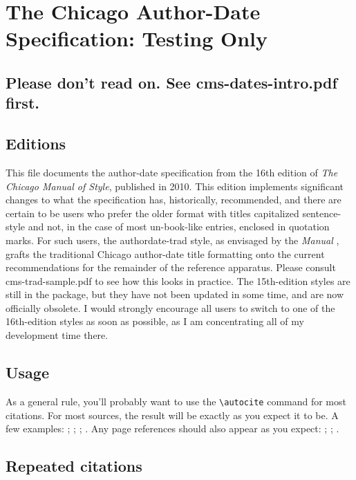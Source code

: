 \documentclass[a4paper,12pt]{report}
\newcommand{\cmd}[1]{\texttt{\textbackslash #1}}
\begin{document}
\section*{The Chicago Author-Date Specification: Testing Only}
\label{sec:spec}

\subsection*{Please don't read on. See cms-dates-intro.pdf first.}
\label{bibernote}

\subsection*{Editions}
\label{editions}

This file documents the author-date specification from the 16th
edition of \emph{The Chicago Manual of Style}, published in 2010.
This edition implements significant changes to what the specification
has, historically, recommended, and there are certain to be users who
prefer the older format with titles capitalized sentence-style and
not, in the case of most un-book-like entries, enclosed in quotation
marks.  For such users, the \textsf{authordate-trad} style, as
envisaged by the \emph{Manual} \autocite*[15.45]{chicago:manual},
grafts the traditional Chicago author-date title formatting onto the
current recommendations for the remainder of the reference apparatus.
Please consult \textsf{cms-trad-sample.pdf} to see how this looks in
practice.  The 15th-edition styles are still in the package, but they
have not been updated in some time, and are now officially obsolete.
I would strongly encourage all users to switch to one of the
16th-edition styles as soon as possible, as I am concentrating all of
my development time there.

\subsection*{Usage}
\label{usage}

As a general rule, you'll probably want to use the \cmd{autocite}
command for most citations.  For most sources, the result will be
exactly as you expect it to be.  A few examples:
\autocite{adorno:benj}; \autocite{ashbrook:brain};
\autocite{babb:peru}; \autocite{barcott:review}.  Any page references
should also appear as you expect: \autocite[338]{batson};
\autocite[79]{beattie:crime}; \autocite[36]{boxer:china}.

\subsection*{Repeated citations}
\label{sec:ibidem}
\end{document}

